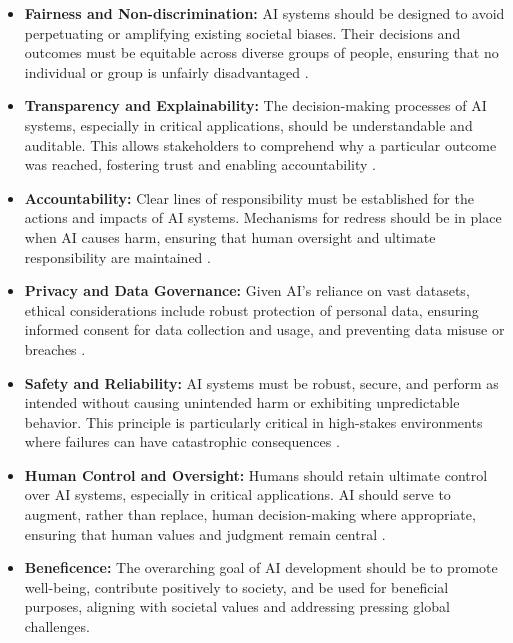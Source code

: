 \begin{itemize}
    \item \textbf{Fairness and Non-discrimination:} AI systems should be designed to avoid perpetuating or amplifying existing societal biases. Their decisions and outcomes must be equitable across diverse groups of people, ensuring that no individual or group is unfairly disadvantaged \parencite{Buolamwini2018GenderShades}.
    \item \textbf{Transparency and Explainability:} The decision-making processes of AI systems, especially in critical applications, should be understandable and auditable. This allows stakeholders to comprehend why a particular outcome was reached, fostering trust and enabling accountability \parencite{Adadi2018ExplainableAI}.
    \item \textbf{Accountability:} Clear lines of responsibility must be established for the actions and impacts of AI systems. Mechanisms for redress should be in place when AI causes harm, ensuring that human oversight and ultimate responsibility are maintained \parencite{NIST2023AIRMF}.
    \item \textbf{Privacy and Data Governance:} Given AI's reliance on vast datasets, ethical considerations include robust protection of personal data, ensuring informed consent for data collection and usage, and preventing data misuse or breaches \parencite{IBM2023DataGovernance}.
    \item \textbf{Safety and Reliability:} AI systems must be robust, secure, and perform as intended without causing unintended harm or exhibiting unpredictable behavior. This principle is particularly critical in high-stakes environments where failures can have catastrophic consequences \parencite{GoogleSAIF2023}.
    \item \textbf{Human Control and Oversight:} Humans should retain ultimate control over AI systems, especially in critical applications. AI should serve to augment, rather than replace, human decision-making where appropriate, ensuring that human values and judgment remain central \parencite{MaximAI2025}.
    \item \textbf{Beneficence:} The overarching goal of AI development should be to promote well-being, contribute positively to society, and be used for beneficial purposes, aligning with societal values and addressing pressing global challenges.
\end{itemize}

